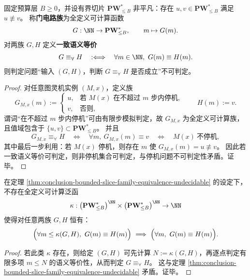 \begin{theorem}[有界切片门电路族的一致语义等价不可判定]\label{thm:conclusion-bounded-slice-family-equivalence-undecidable}
固定预算层 \(B\ge 0\)，并设有界切片 \(\mathbf{PW}^{\ast}_{\le B}\) 非平凡：存在
\(
u,v\in\mathbf{PW}^{\ast}_{\le B}
\)
满足 \(u\not\equiv v\)。
称\textbf{门电路族}为全定义可计算函数
\[
G:\NN\to \mathbf{PW}^{\ast}_{\le B},\qquad m\mapsto G(m).
\]
对两族 \(G,H\) 定义\textbf{一致语义等价}
\[
G\equiv_{\forall}H\quad:\Longleftrightarrow\quad \forall m\in\NN,\ G(m)\equiv H(m).
\]
则判定问题“输入 \((G,H)\)，判断 \(G\equiv_{\forall}H\) 是否成立”不可判定。
\end{theorem}
\begin{proof}
对任意图灵机实例 \((M,x)\)，定义族
\[
G_{M,x}(m):=
\begin{cases}
u,& \text{若 \(M(x)\) 在不超过 \(m\) 步内停机},\\
v,& \text{否则},
\end{cases}
\qquad
H(m):=v.
\]
谓词“在不超过 \(m\) 步内停机”可由有限步模拟判定，故 \(G_{M,x}\) 为全定义可计算族，且值域包含于 \(\{u,v\}\subset\mathbf{PW}^{\ast}_{\le B}\)。
并且
\[
G_{M,x}\equiv_{\forall}H
\quad\Longleftrightarrow\quad
\forall m,\ G_{M,x}(m)\equiv v
\quad\Longleftrightarrow\quad
M(x)\ \text{不停机},
\]
其中最后一步利用：若 \(M(x)\) 停机，则存在 \(m\) 使 \(G_{M,x}(m)=u\not\equiv v\)。
因此若一致语义等价可判定，则非停机集合可判定，与停机问题不可判定性矛盾。证毕。
\end{proof}

\begin{corollary}[一致语义等价不具备可计算的有限截断见证界]\label{cor:conclusion-no-computable-uniform-truncation-witness}
在定理 \ref{thm:conclusion-bounded-slice-family-equivalence-undecidable} 的设定下，不存在全定义可计算泛函
\[
\kappa:\bigl(\mathbf{PW}^{\ast}_{\le B}\bigr)^{\NN}\times \bigl(\mathbf{PW}^{\ast}_{\le B}\bigr)^{\NN}\to \NN
\]
使得对任意两族 \(G,H\) 恒有：
\[
\Bigl(\forall m\le \kappa(G,H),\ G(m)\equiv H(m)\Bigr)
\ \Longrightarrow\
\Bigl(\forall m,\ G(m)\equiv H(m)\Bigr).
\]
\end{corollary}
\begin{proof}
若此类 \(\kappa\) 存在，则给定 \((G,H)\) 可先计算 \(N:=\kappa(G,H)\)，再逐点判定有限多项 \(m\le N\) 的语义等价性，从而判定 \(G\equiv_{\forall}H\)。
这与定理 \ref{thm:conclusion-bounded-slice-family-equivalence-undecidable} 矛盾。证毕。
\end{proof}

\endinput
